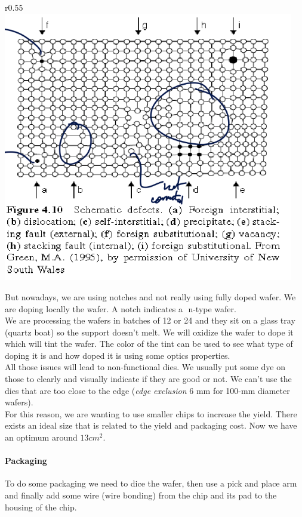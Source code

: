 \documentclass[
]{article}
\begin{document}
r0.55
\includegraphics[width=0.95\textwidth,height=\textheight]{silicium_non_idealities.png}

But nowadays, we are using notches and not really using fully doped
wafer. We are doping locally the wafer. A notch indicates a \(<100>\)
n-type wafer.\\
We are processing the wafers in batches of 12 or 24 and they sit on a
glass tray (quartz boat) so the support doesn't melt. We will oxidize
the wafer to dope it which will tint the wafer. The color of the tint
can be used to see what type of doping it is and how doped it is using
some optics properties.\\
All those issues will lead to non-functional dies. We usually put some
dye on those to clearly and visually indicate if they are good or not.
We can't use the dies that are too close to the edge (\emph{edge
exclusion} 6 mm for 100-mm diameter wafers).\\
For this reason, we are wanting to use smaller chips to increase the
yield. There exists an ideal size that is related to the yield and
packaging cost. Now we have an optimum around \(13 cm^2\).

\hypertarget{packaging}{%
\paragraph{Packaging}\label{packaging}}

To do some packaging we need to dice the wafer, then use a pick and
place arm and finally add some wire (wire bonding) from the chip and its
pad to the housing of the chip.
\end{document}
